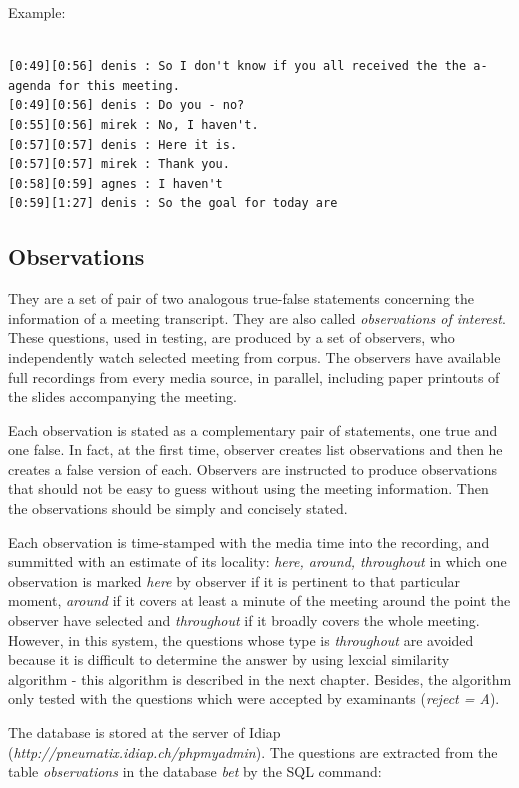 \documentclass[12pt, a4paper]{report}
\begin{document}
Example:
\small
\begin{verbatim}  

[0:49][0:56] denis : So I don't know if you all received the the a- agenda for this meeting. 
[0:49][0:56] denis : Do you - no? 
[0:55][0:56] mirek : No, I haven't. 
[0:57][0:57] denis : Here it is. 
[0:57][0:57] mirek : Thank you.
[0:58][0:59] agnes : I haven't
[0:59][1:27] denis : So the goal for today are
\end{verbatim}
\normalsize

\subsection{Observations}
They are a set of pair of two analogous true-false statements concerning the information of a meeting transcript. They are also called \textit{observations of interest}. These questions, used in testing, are produced by a set of observers, who independently watch selected meeting from corpus. The observers have available full recordings from every media source, in parallel, including paper printouts of the slides accompanying the meeting. \cite{3}

Each observation is stated as a complementary pair of statements, one true and one false. In fact, at the first time, observer creates list observations and then he creates a false version of each. Observers are instructed to produce observations that should not be easy to guess without using the meeting information. Then the observations should be simply and concisely stated.

Each observation is time-stamped with the media time into the recording, and summitted with an estimate of its locality: \textit{here, around, throughout} \cite{5} in which one observation is marked \textit{here} by observer if it is pertinent to that particular moment, \textit{around} if it covers at least a minute of the meeting around the point the observer have selected and \textit{throughout} if it broadly covers the whole meeting. However, in this system, the questions whose type is \textit{throughout} are avoided because it is difficult to determine the answer by using lexcial similarity algorithm - this algorithm is described in the next chapter. Besides, the algorithm only tested with the questions which were accepted by examinants (\textit{reject = A}).

The database is stored at the server of Idiap (\emph{http://pneumatix.idiap.ch/phpmyadmin}). The questions are extracted from the table \emph{observations} in the database \emph{bet} by the SQL command:
\end{document}
